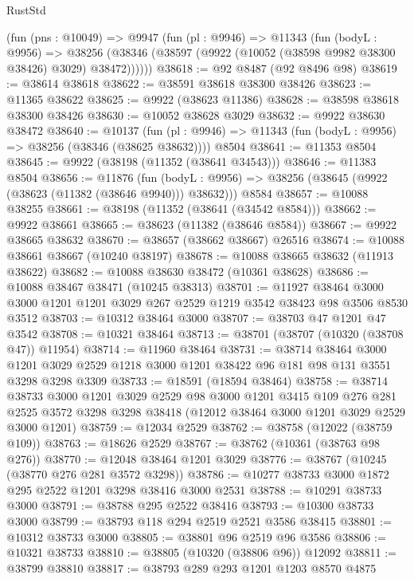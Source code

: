\begin{lexlean}{RustStd}
\begin{coremodule}
    (fun (pns : @10049) =>
    @9947
      (fun (pl : @9946) =>
      @11343
        (fun (bodyL : @9956) =>
        @38256 (@38346 (@38597 (@9922 (@10052 (@38598 @9982 @38300 @38426) @3029) @38472))))))
@38618 := @92 @8487 (@92 @8496 @98)
@38619 := @38614 @38618
@38622 := @38591 @38618 @38300 @38426
@38623 := @11365 @38622
@38625 := @9922 (@38623 @11386)
@38628 := @38598 @38618 @38300 @38426
@38630 := @10052 @38628 @3029
@38632 := @9922 @38630 @38472
@38640 := @10137
    (fun (pl : @9946) => @11343 (fun (bodyL : @9956) => @38256 (@38346 (@38625 @38632))))
    @8504
@38641 := @11353 @8504
@38645 := @9922 (@38198 (@11352 (@38641 @34543)))
@38646 := @11383 @8504
@38656 := @11876
    (fun (bodyL : @9956) => @38256 (@38645 (@9922 (@38623 (@11382 (@38646 @9940))) @38632)))
    @8584
@38657 := @10088 @38255
@38661 := @38198 (@11352 (@38641 (@34542 @8584)))
@38662 := @9922 @38661
@38665 := @38623 (@11382 (@38646 @8584))
@38667 := @9922 @38665 @38632
@38670 := @38657 (@38662 @38667) @26516
@38674 := @10088 @38661 @38667 (@10240 @38197)
@38678 := @10088 @38665 @38632 (@11913 @38622)
@38682 := @10088 @38630 @38472 (@10361 @38628)
@38686 := @10088 @38467 @38471 (@10245 @38313)
@38701 := @11927
    @38464
    @3000
    @3000
    @1201
    @1201
    @3029
    @267
    @2529
    @1219
    @3542
    @38423
    @98
    @3506
    @8530
    @3512
@38703 := @10312 @38464 @3000
@38707 := @38703 @47 @1201 @47 @3542
@38708 := @10321 @38464
@38713 := @38701 (@38707 (@10320 (@38708 @47)) @11954)
@38714 := @11960 @38464
@38731 := @38714
    @38464
    @3000
    @1201
    @3029
    @2529
    @1218
    @3000
    @1201
    @38422
    @96
    @181
    @98
    @131
    @3551
    @3298
    @3298
    @3309
@38733 := @18591 (@18594 @38464)
@38758 := @38714
    @38733
    @3000
    @1201
    @3029
    @2529
    @98
    @3000
    @1201
    @3415
    @109
    @276
    @281
    @2525
    @3572
    @3298
    @3298
    @38418
    (@12012 @38464 @3000 @1201 @3029 @2529 @3000 @1201)
@38759 := @12034 @2529
@38762 := @38758 (@12022 (@38759 @109))
@38763 := @18626 @2529
@38767 := @38762 (@10361 (@38763 @98 @276))
@38770 := @12048 @38464 @1201 @3029
@38776 := @38767 (@10245 (@38770 @276 @281 @3572 @3298))
@38786 := @10277 @38733 @3000 @1872 @295 @2522 @1201 @3298 @38416 @3000 @2531
@38788 := @10291 @38733 @3000
@38791 := @38788 @295 @2522 @38416
@38793 := @10300 @38733 @3000
@38799 := @38793 @118 @294 @2519 @2521 @3586 @38415
@38801 := @10312 @38733 @3000
@38805 := @38801 @96 @2519 @96 @3586
@38806 := @10321 @38733
@38810 := @38805 (@10320 (@38806 @96)) @12092
@38811 := @38799 @38810
@38817 := @38793 @289 @293 @1201 @1203 @8570 @4875

\end{coremodule}
\end{lexlean}
